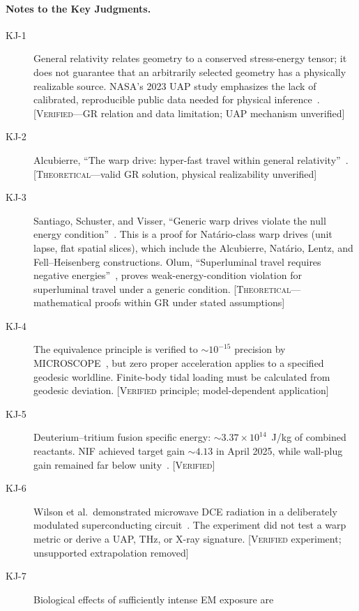 \documentclass[aps,prd,twocolumn,superscriptaddress,nofootinbib,floatfix]{revtex4-2}
\begin{document}
\paragraph{Notes to the Key Judgments.}
\begin{description}
  \item[KJ-1] General relativity relates geometry to a conserved stress-energy
    tensor; it does not guarantee that an arbitrarily selected geometry has a
    physically realizable source. NASA's 2023 UAP study emphasizes the lack of
    calibrated, reproducible public data needed for physical
    inference~\cite{MTW1973,Wald1984,NASA_UAP2023}. [\textsc{Verified}---GR
    relation and data limitation; UAP mechanism unverified]
  \item[KJ-2] Alcubierre, ``The warp drive: hyper-fast travel within general
    relativity''~\cite{Alcubierre1994}. [\textsc{Theoretical}---valid GR
    solution, physical realizability unverified]
  \item[KJ-3] Santiago, Schuster, and Visser, ``Generic warp drives violate the
    null energy condition''~\cite{SantiagoVisser2022}. This is a proof for
    Nat\'ario-class warp drives (unit lapse, flat spatial slices), which include
    the Alcubierre, Nat\'ario, Lentz, and Fell--Heisenberg constructions. Olum,
    ``Superluminal travel requires negative energies''~\cite{Olum1998}, proves
    weak-energy-condition violation for superluminal travel under a generic
    condition. [\textsc{Theoretical}---mathematical proofs within GR under stated
    assumptions]
  \item[KJ-4] The equivalence principle is verified to ${\sim}10^{-15}$ precision
    by MICROSCOPE~\cite{Touboul2022}, but zero proper acceleration applies to a
    specified geodesic worldline. Finite-body tidal loading must be calculated
    from geodesic deviation. [\textsc{Verified} principle; model-dependent
    application]
  \item[KJ-5] Deuterium--tritium fusion specific energy:
    ${\sim}3.37\times10^{14}$~J/kg of combined reactants. NIF achieved target
    gain ${\sim}4.13$ in April 2025, while wall-plug gain remained far below
    unity~\cite{LLNL_NIF2025}. [\textsc{Verified}]
  \item[KJ-6] Wilson et al.\ demonstrated microwave DCE radiation in a
    deliberately modulated superconducting circuit~\cite{Wilson2011}. The
    experiment did not test a warp metric or derive a UAP, THz, or X-ray
    signature. [\textsc{Verified} experiment; unsupported extrapolation removed]
  \item[KJ-7] Biological effects of sufficiently intense EM exposure are

\end{description}
\end{document}
